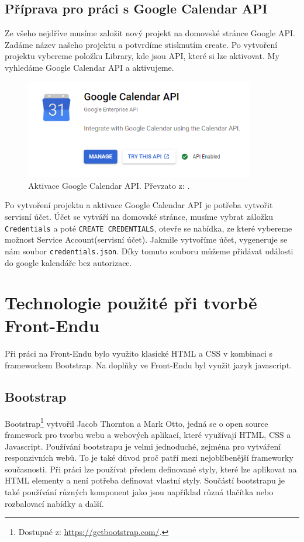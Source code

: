 \subsection{Příprava pro práci s Google Calendar API}

Ze všeho nejdříve musíme založit nový projekt na domovské stránce Google API. Zadáme název našeho projektu a potvrdíme stisknutím create. Po vytvoření projektu vybereme položku Library, kde jsou API, které si lze aktivovat. My vyhledáme Google Calendar API a aktivujeme. \cite{googleapi}

\begin{figure}[H]
    \centering
    \includegraphics[width=100mm]{obrazky-figures/googlecalapi.png}
    
    \caption{Aktivace Google Calendar API. Převzato z: \cite{googleapi}.}
\end{figure}


Po vytvoření projektu a aktivace Google Calendar API je potřeba vytvořit servisní účet. Účet se vytváří na domovské stránce, musíme vybrat záložku \texttt{Credentials} a poté \texttt{CREATE CREDENTIALS}, otevře se nabídka, ze které vybereme možnost Service Account(servisní účet). Jakmile vytvoříme účet, vygeneruje se nám soubor \texttt{credentials.json}. Díky tomuto souboru můžeme přidávat události do google kalendáře bez autorizace. \cite{cal}


\section{Technologie použité při tvorbě Front-Endu}

Při práci na Front-Endu bylo využito klasické HTML a CSS v kombinaci s frameworkem Bootstrap. Na doplňky ve Front-Endu byl využit jazyk javascript. 

\subsection{Bootstrap} 
Bootstrap\footnote[2]{Dostupné z: \url{https://getbootstrap.com/}.} vytvořil Jacob Thornton a Mark Otto, jedná se o open source framework pro tvorbu webu a webových aplikací, které využívají HTML, CSS a Javascript. Používání bootstrapu je velmi jednoduché, zejména pro vytváření responzivních webů. To je také důvod proč patří mezi nejoblíbenější frameworky současnosti. Při práci lze používat předem definované styly, které lze aplikovat na HTML elementy a není potřeba definovat vlastní styly. Součástí bootstrapu je také používání různých komponent jako jsou například různá tlačítka nebo rozbalovací nabídky a další. \cite{bootstrap}

